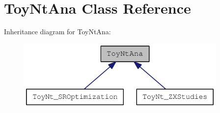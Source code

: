 \hypertarget{classToyNtAna}{
\section{ToyNtAna Class Reference}
\label{classToyNtAna}
}
Inheritance diagram for ToyNtAna:\nopagebreak
\begin{figure}[H]
\begin{center}
\leavevmode
\includegraphics[width=294pt]{classToyNtAna__inherit__graph}
\end{center}
\end{figure}
